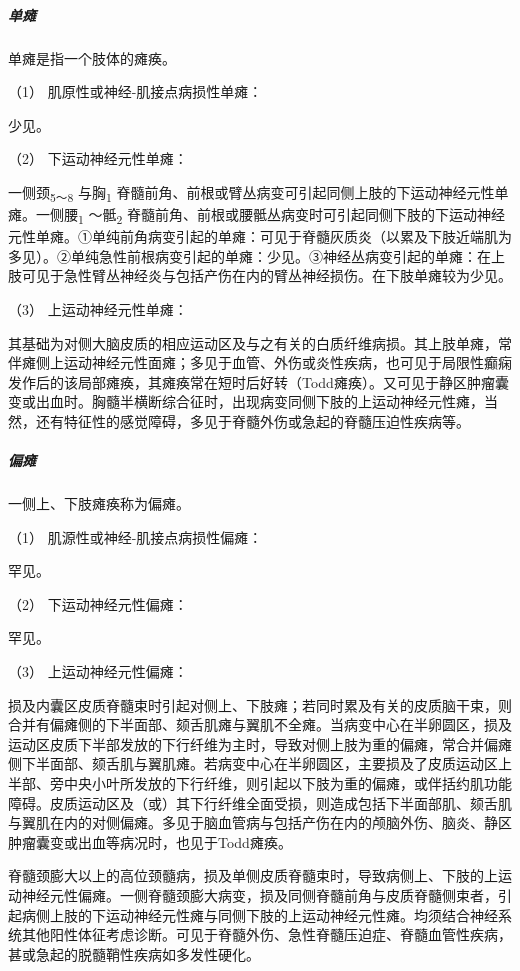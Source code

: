 \subparagraph{单瘫}

单瘫是指一个肢体的瘫痪。

\hypertarget{text00018.htmlux5cux23CHP1-6-2-3-4-1}{}
（1） 肌原性或神经-肌接点病损性单瘫：

少见。

\hypertarget{text00018.htmlux5cux23CHP1-6-2-3-4-2}{}
（2） 下运动神经元性单瘫：

一侧颈\textsubscript{5～8} 与胸\textsubscript{1}
脊髓前角、前根或臂丛病变可引起同侧上肢的下运动神经元性单瘫。一侧腰\textsubscript{1}
～骶\textsubscript{2}
脊髓前角、前根或腰骶丛病变时可引起同侧下肢的下运动神经元性单瘫。①单纯前角病变引起的单瘫：可见于脊髓灰质炎（以累及下肢近端肌为多见）。②单纯急性前根病变引起的单瘫：少见。③神经丛病变引起的单瘫：在上肢可见于急性臂丛神经炎与包括产伤在内的臂丛神经损伤。在下肢单瘫较为少见。

\hypertarget{text00018.htmlux5cux23CHP1-6-2-3-4-3}{}
（3） 上运动神经元性单瘫：

其基础为对侧大脑皮质的相应运动区及与之有关的白质纤维病损。其上肢单瘫，常伴瘫侧上运动神经元性面瘫；多见于血管、外伤或炎性疾病，也可见于局限性癫痫发作后的该局部瘫痪，其瘫痪常在短时后好转（Todd瘫痪）。又可见于静区肿瘤囊变或出血时。胸髓半横断综合征时，出现病变同侧下肢的上运动神经元性瘫，当然，还有特征性的感觉障碍，多见于脊髓外伤或急起的脊髓压迫性疾病等。

\subparagraph{偏瘫}

一侧上、下肢瘫痪称为偏瘫。

\hypertarget{text00018.htmlux5cux23CHP1-6-2-3-5-1}{}
（1） 肌源性或神经-肌接点病损性偏瘫：

罕见。

\hypertarget{text00018.htmlux5cux23CHP1-6-2-3-5-2}{}
（2） 下运动神经元性偏瘫：

罕见。

\hypertarget{text00018.htmlux5cux23CHP1-6-2-3-5-3}{}
（3） 上运动神经元性偏瘫：

损及内囊区皮质脊髓束时引起对侧上、下肢瘫；若同时累及有关的皮质脑干束，则合并有偏瘫侧的下半面部、颏舌肌瘫与翼肌不全瘫。当病变中心在半卵圆区，损及运动区皮质下半部发放的下行纤维为主时，导致对侧上肢为重的偏瘫，常合并偏瘫侧下半面部、颏舌肌与翼肌瘫。若病变中心在半卵圆区，主要损及了皮质运动区上半部、旁中央小叶所发放的下行纤维，则引起以下肢为重的偏瘫，或伴括约肌功能障碍。皮质运动区及（或）其下行纤维全面受损，则造成包括下半面部肌、颏舌肌与翼肌在内的对侧偏瘫。多见于脑血管病与包括产伤在内的颅脑外伤、脑炎、静区肿瘤囊变或出血等病况时，也见于Todd瘫痪。

脊髓颈膨大以上的高位颈髓病，损及单侧皮质脊髓束时，导致病侧上、下肢的上运动神经元性偏瘫。一侧脊髓颈膨大病变，损及同侧脊髓前角与皮质脊髓侧束者，引起病侧上肢的下运动神经元性瘫与同侧下肢的上运动神经元性瘫。均须结合神经系统其他阳性体征考虑诊断。可见于脊髓外伤、急性脊髓压迫症、脊髓血管性疾病，甚或急起的脱髓鞘性疾病如多发性硬化。

